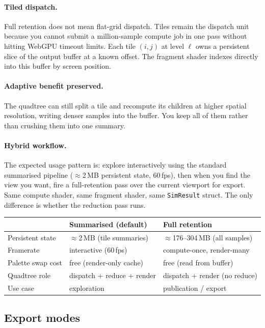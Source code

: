 \documentclass[11pt]{report}
\begin{document}
\paragraph{Tiled dispatch.} Full retention does not mean flat-grid dispatch. Tiles remain the dispatch unit because you cannot submit a million-sample compute job in one pass without hitting WebGPU timeout limits. Each tile $(i,j)$ at level $\ell$ owns a persistent slice of the output buffer at a known offset. The fragment shader indexes directly into this buffer by screen position.

\paragraph{Adaptive benefit preserved.} The quadtree can still split a tile and recompute its children at higher spatial resolution, writing denser samples into the buffer. You keep all of them rather than crushing them into one summary.

\paragraph{Hybrid workflow.} The expected usage pattern is: explore interactively using the standard summarised pipeline ($\approx$2\,MB persistent state, 60\,fps), then when you find the view you want, fire a full-retention pass over the current viewport for export. Same compute shader, same fragment shader, same \texttt{SimResult} struct. The only difference is whether the reduction pass runs.

\begin{center}
\begin{tabular}{lll}
\toprule
& Summarised (default) & Full retention \\
\midrule
Persistent state & $\approx$2\,MB (tile summaries) & $\approx$176--304\,MB (all samples) \\
Framerate & interactive (60\,fps) & compute-once, render-many \\
Palette swap cost & free (render-only cache) & free (read from buffer) \\
Quadtree role & dispatch + reduce + render & dispatch + render (no reduce) \\
Use case & exploration & publication / export \\
\bottomrule
\end{tabular}
\end{center}

\subsection{Export modes}
\label{sec:flat_render}
\end{document}
